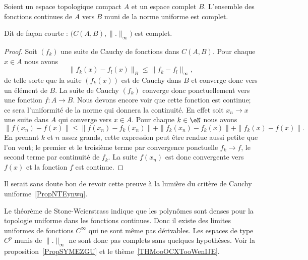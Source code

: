 \begin{lemma}       \label{LemdLKKnd}
	Soient un espace topologique compact \( A\) et un espace complet \( B\). L'ensemble des fonctions continues de \( A\) vers \( B\) muni de la norme uniforme est complet.

	Dit de façon courte : \( \big( C(A,B),\| . \|_{\infty} \big)\) est complet.
\end{lemma}

\begin{proof}
	Soit \( (f_k)\) une suite de Cauchy de fonctions dans \( C(A,B)\). Pour chaque \( x\in A \) nous avons
	\begin{equation}
		\| f_k(x)-f_l(x) \|_B\leq \| f_k-f_l \|_{\infty},
	\end{equation}
	de telle sorte que la suite \( (f_k(x))\) est de Cauchy dans \( B\) et converge donc vers un élément de \( B\). La suite de Cauchy \( (f_k)\) converge donc ponctuellement vers une fonction \( f\colon A\to B\). Nous devons encore voir que cette fonction est continue; ce sera l'uniformité de la norme qui donnera la continuité. En effet soit \( x_n\to x\) une suite dans \( A\) qui converge vers \( x\in A\). Pour chaque \( k\in \eN\) nous avons
	\begin{equation}
		\| f(x_n)-f(x) \|\leq \| f(x_n)-f_k(x_n) \|  +\| f_k(x_n)-f_k(x) \|+\| f_k(x)-f(x) \|.
	\end{equation}
	En prenant \( k\) et \( n\) assez grands, cette expression peut être rendue aussi petite que l'on veut; le premier et le troisième terme par convergence ponctuelle \( f_k\to f\), le second terme par continuité de \( f_k\). La suite \( f(x_n)\) est donc convergente vers \( f(x)\) et la fonction \( f\) est continue.
\end{proof}

\begin{probleme}
	Il serait sans doute bon de revoir cette preuve à la lumière du critère de Cauchy uniforme~\ref{PropNTEynwq}.
\end{probleme}


\begin{normaltext}
	Le théorème de Stone-Weierstrass indique que les polynômes sont denses pour la topologie uniforme dans les fonctions continues. Donc il existe des limites uniformes de fonctions \( C^{\infty}\) qui ne sont même pas dérivables. Les espaces de type \( C^p\) munis de \( \| . \|_{\infty}\) ne sont donc pas complets sans quelques hypothèses. Voir la proposition~\ref{PropSYMEZGU} et le thème~\ref{THMooOCXTooWenIJE}.
\end{normaltext}


